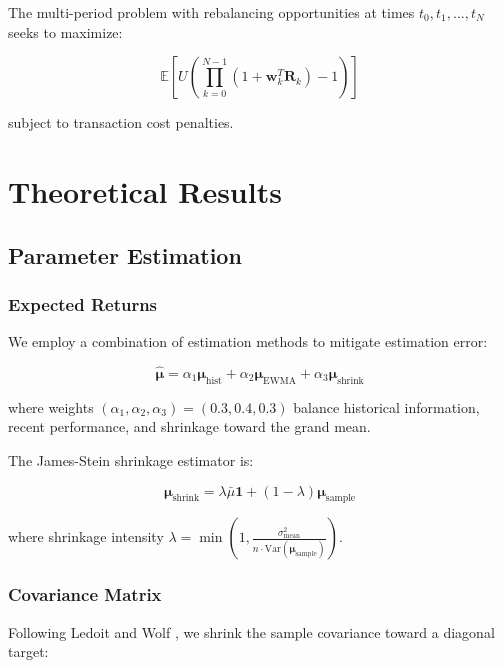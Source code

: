 \documentclass[12pt,a4paper]{article}
\newcommand{\E}{\mathbb{E}}
\begin{document}
The multi-period problem with rebalancing opportunities at times $t_0, t_1, ..., t_N$ seeks to maximize:

\begin{equation}
\E\left[U\left(\prod_{k=0}^{N-1} (1 + \mathbf{w}_k^T \mathbf{R}_k) - 1\right)\right]
\end{equation}

subject to transaction cost penalties.

\section{Theoretical Results}

\subsection{Parameter Estimation}

\subsubsection{Expected Returns}
We employ a combination of estimation methods to mitigate estimation error:

\begin{equation}
\hat{\boldsymbol{\mu}} = \alpha_1 \boldsymbol{\mu}_{\text{hist}} + \alpha_2 \boldsymbol{\mu}_{\text{EWMA}} + \alpha_3 \boldsymbol{\mu}_{\text{shrink}}
\end{equation}

where weights $(\alpha_1, \alpha_2, \alpha_3) = (0.3, 0.4, 0.3)$ balance historical information, recent performance, and shrinkage toward the grand mean.

The James-Stein shrinkage estimator \cite{jorion1985} is:

\begin{equation}
\boldsymbol{\mu}_{\text{shrink}} = \lambda \bar{\mu} \mathbf{1} + (1-\lambda) \boldsymbol{\mu}_{\text{sample}}
\end{equation}

where shrinkage intensity $\lambda = \min\left(1, \frac{\sigma^2_{\text{mean}}}{n \cdot \text{Var}(\boldsymbol{\mu}_{\text{sample}})}\right)$.

\subsubsection{Covariance Matrix}
Following Ledoit and Wolf \cite{ledoit2004}, we shrink the sample covariance toward a diagonal target:
\end{document}
